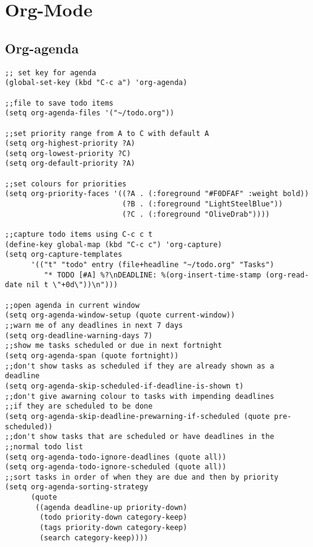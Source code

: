 \documentclass[11pt]{article}
\begin{document}
\section{Org-Mode}
\label{sec:orgheadline47}
\subsection{Org-agenda}
\label{sec:orgheadline39}
\begin{verbatim}
;; set key for agenda
(global-set-key (kbd "C-c a") 'org-agenda)

;;file to save todo items
(setq org-agenda-files '("~/todo.org"))

;;set priority range from A to C with default A
(setq org-highest-priority ?A)
(setq org-lowest-priority ?C)
(setq org-default-priority ?A)

;;set colours for priorities
(setq org-priority-faces '((?A . (:foreground "#F0DFAF" :weight bold))
                           (?B . (:foreground "LightSteelBlue"))
                           (?C . (:foreground "OliveDrab"))))

;;capture todo items using C-c c t
(define-key global-map (kbd "C-c c") 'org-capture)
(setq org-capture-templates
      '(("t" "todo" entry (file+headline "~/todo.org" "Tasks")
         "* TODO [#A] %?\nDEADLINE: %(org-insert-time-stamp (org-read-date nil t \"+0d\"))\n")))

;;open agenda in current window
(setq org-agenda-window-setup (quote current-window))
;;warn me of any deadlines in next 7 days
(setq org-deadline-warning-days 7)
;;show me tasks scheduled or due in next fortnight
(setq org-agenda-span (quote fortnight))
;;don't show tasks as scheduled if they are already shown as a deadline
(setq org-agenda-skip-scheduled-if-deadline-is-shown t)
;;don't give awarning colour to tasks with impending deadlines
;;if they are scheduled to be done
(setq org-agenda-skip-deadline-prewarning-if-scheduled (quote pre-scheduled))
;;don't show tasks that are scheduled or have deadlines in the
;;normal todo list
(setq org-agenda-todo-ignore-deadlines (quote all))
(setq org-agenda-todo-ignore-scheduled (quote all))
;;sort tasks in order of when they are due and then by priority
(setq org-agenda-sorting-strategy
      (quote
       ((agenda deadline-up priority-down)
        (todo priority-down category-keep)
        (tags priority-down category-keep)
        (search category-keep))))
\end{verbatim}
\end{document}
